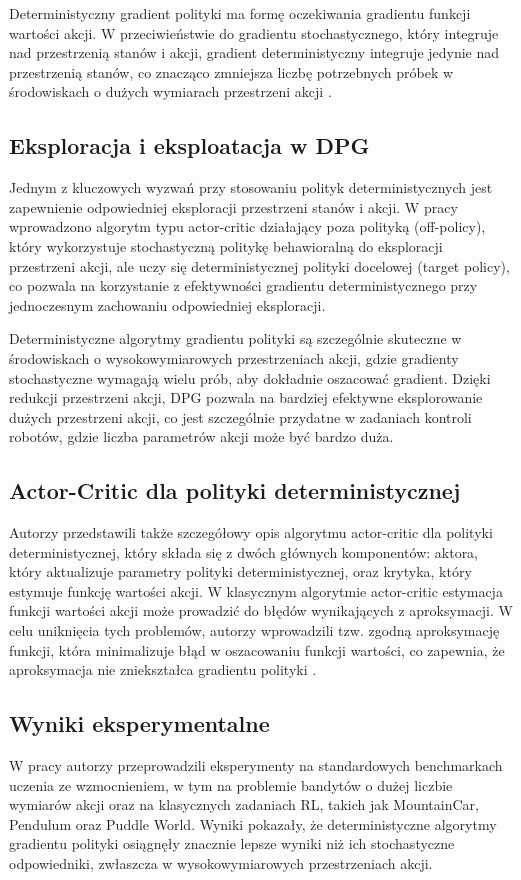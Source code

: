 Deterministyczny gradient polityki ma formę oczekiwania gradientu funkcji wartości akcji. W przeciwieństwie do gradientu stochastycznego, który integruje nad przestrzenią stanów i akcji, gradient deterministyczny integruje jedynie nad przestrzenią stanów, co znacząco zmniejsza liczbę potrzebnych próbek w środowiskach o dużych wymiarach przestrzeni akcji \cite{GRAD}.

\subsection{Eksploracja i eksploatacja w DPG}
Jednym z kluczowych wyzwań przy stosowaniu polityk deterministycznych jest zapewnienie odpowiedniej eksploracji przestrzeni stanów i akcji. W pracy \cite{GRAD} wprowadzono algorytm typu actor-critic działający poza polityką (off-policy), który wykorzystuje stochastyczną politykę behawioralną do eksploracji przestrzeni akcji, ale uczy się deterministycznej polityki docelowej (target policy), co pozwala na korzystanie z efektywności gradientu deterministycznego przy jednoczesnym zachowaniu odpowiedniej eksploracji.

Deterministyczne algorytmy gradientu polityki są szczególnie skuteczne w środowiskach o wysokowymiarowych przestrzeniach akcji, gdzie gradienty stochastyczne wymagają wielu prób, aby dokładnie oszacować gradient. Dzięki redukcji przestrzeni akcji, DPG pozwala na bardziej efektywne eksplorowanie dużych przestrzeni akcji, co jest szczególnie przydatne w zadaniach kontroli robotów, gdzie liczba parametrów akcji może być bardzo duża.

\subsection{Actor-Critic dla polityki deterministycznej}
Autorzy \cite{GRAD} przedstawili także szczegółowy opis algorytmu actor-critic dla polityki deterministycznej, który składa się z dwóch głównych komponentów: aktora, który aktualizuje parametry polityki deterministycznej, oraz krytyka, który estymuje funkcję wartości akcji. W klasycznym algorytmie actor-critic estymacja funkcji wartości akcji może prowadzić do błędów wynikających z aproksymacji. W celu uniknięcia tych problemów, autorzy wprowadzili tzw. zgodną aproksymację funkcji, która minimalizuje błąd w oszacowaniu funkcji wartości, co zapewnia, że aproksymacja nie zniekształca gradientu polityki \cite{GRAD}.

\subsection{Wyniki eksperymentalne}
W pracy \cite{GRAD} autorzy przeprowadzili eksperymenty na standardowych benchmarkach uczenia ze wzmocnieniem, w tym na problemie bandytów o dużej liczbie wymiarów akcji oraz na klasycznych zadaniach RL, takich jak MountainCar, Pendulum oraz Puddle World. Wyniki pokazały, że deterministyczne algorytmy gradientu polityki osiągnęły znacznie lepsze wyniki niż ich stochastyczne odpowiedniki, zwłaszcza w wysokowymiarowych przestrzeniach akcji.

